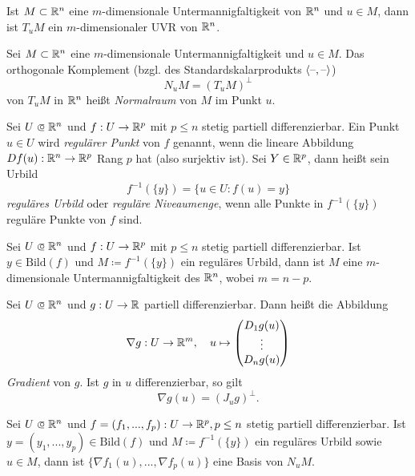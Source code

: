 \documentclass{cheat-sheet}
\begin{document}
\begin{satz}
Ist $M \subset \mathbb{R}^n$ eine $m$-dimensionale Untermannigfaltigkeit von $\mathbb{R}^n$ und $u \in M$, dann ist $T_u M$ ein $m$-dimensionaler UVR von $\mathbb{R}^n$.
\end{satz}

\begin{defn}
Sei $M \subset \mathbb{R}^n$ eine $m$-dimensionale Untermannigfaltigkeit und $u \in M$. Das orthogonale Komplement (bzgl. des Standardskalarprodukts $\langle \text{--}, \text{--} \rangle$)
\[ N_u M = (T_u M)^\perp \]
von $T_u M$ in $\mathbb{R}^n$ heißt \emph{Normalraum} von $M$ im Punkt $u$.
\end{defn}

\begin{defn}
Sei $U \opn \R^n$ und $f : U \to \mathbb{R}^p$ mit $p \le n$ stetig partiell differenzierbar. Ein Punkt $u \in U$ wird \emph{regulärer Punkt} von $f$ genannt, wenn die lineare Abbildung $D f(u) : \mathbb{R}^n \to \mathbb{R}^p$ Rang $p$ hat (also surjektiv ist). Sei $Y \in \mathbb{R}^p$, dann heißt sein Urbild
\[ f^{-1}(\{y\}) = \{ u \in U : f(u) = y \} \]
\emph{reguläres Urbild} oder \emph{reguläre Niveaumenge}, wenn alle Punkte in $f^{-1}(\{ y \})$ reguläre Punkte von $f$ sind.
\end{defn}

\begin{defn}
Sei $U \opn \R^n$ und $f : U \to \mathbb{R}^p$ mit $p \le n$ stetig partiell differenzierbar. Ist $y \in \mathrm{Bild}(f)$ und $M \coloneqq f^{-1}(\{ y \})$ ein reguläres Urbild, dann ist $M$ eine $m$-dimensionale Untermannigfaltigkeit des $\mathbb{R}^n$, wobei $m = n - p$.
\end{defn}

\begin{defn}
Sei $U \opn \R^n$ und $g : U \to \mathbb{R}$ partiell differenzierbar. Dann heißt die Abbildung
\[ \nabla g : U \to \mathbb{R}^m,\quad u \mapsto \begin{pmatrix} D_1 g(u) \\ \vdots \\ D_n g(u) \end{pmatrix} \]
\emph{Gradient} von $g$. Ist $g$ in $u$ differenzierbar, so gilt
\[ \nabla g(u) = (J_u g)^\perp. \]
\end{defn}

\begin{satz}
Sei $U \opn \R^n$ und $f = (f_1, ..., f_p) : U \to \mathbb{R}^p, p \le n$ stetig partiell differenzierbar. Ist $y = (y_1, ..., y_p) \in \mathrm{Bild}(f)$ und $M \coloneqq f^{-1}(\{ y \})$ ein reguläres Urbild sowie $u \in M$, dann ist $\{ \nabla f_1(u), ..., \nabla f_p(u) \}$ eine Basis von $N_u M$.
\end{satz}
\end{document}
